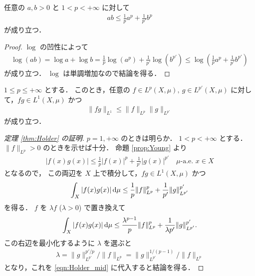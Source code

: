 \begin{proposition}\label{prop:Young}
    任意の $a,b>0$ と $1<p<+\infty$ に対して
    \begin{align*}
        ab\le\frac{1}{p}a^p+\frac{1}{p'}b^p
    \end{align*}
    が成り立つ．
\end{proposition}

\begin{proof}
    $\log$ の凹性によって
    \begin{align*}
        \log(ab)
        =\log a+\log b
        =\frac{1}{p}\log(a^p)+\frac{1}{p'}\log(b^{p'})
        \le\log\!\left(\frac{1}{p}a^p+\frac{1}{p'}b^{p'}\right)
    \end{align*}
    が成り立つ．
    $\log$ は単調増加なので結論を得る．
\end{proof}

\begin{theorem}\label{thm:Holder}
    $1\le p\le+\infty$ とする．
    このとき，任意の $f\in L^p(X,\mu),\ g\in L^{p'}(X,\mu)$ に対して，$fg\in L^1(X,\mu)$ かつ
    \begin{align*}
        \|fg\|_{L^1}\le\|f\|_{L^p}\|g\|_{L^{p'}}
    \end{align*}
    が成り立つ．
\end{theorem}

\begin{proof}[定理 \ref{thm:Holder} の証明]
    $p=1,+\infty$ のときは明らか．
    $1<p<+\infty$ とする．
    $\|f\|_{L^p}>0$ のときを示せば十分．
    命題 \ref{prop:Young} より
    \begin{align*}
        |f(x)g(x)|\le\frac{1}{p}|f(x)|^p+\frac{1}{p'}|g(x)|^{p'}\quad\textrm{$\mu$-a.e.\ $x\in X$}
    \end{align*}
    となるので，
    この両辺を $X$ 上で積分して，$fg\in L^1(X,\mu)$ かつ
    \begin{align*}
        \int_X|f(x)g(x)|\,\mathrm{d}\mu
        \le\frac{1}{p}\|f\|_{L^p}^p+\frac{1}{p'}\|g\|_{L^{p'}}^{p'}
    \end{align*}
    を得る．
    $f$ を $\lambda f$ ($\lambda>0$) で置き換えて
    \begin{align}
        \int_X|f(x)g(x)|\,\mathrm{d}\mu
        \le\frac{\lambda^{p-1}}{p}\|f\|_{L^p}^p+\frac{1}{\lambda p'}\|g\|_{L^{p'}}^{p'}.
        \label{eqn:Holder_mid}
    \end{align}
    この右辺を最小化するように $\lambda$ を選ぶと
    \begin{align*}
        \lambda
        =\|g\|_{L^{p'}}^{p'/p}/\|f\|_{L^p}
        =\|g\|_{L^{p'}}^{1/(p-1)}/\|f\|_{L^p}
    \end{align*}
    となり，これを \eqref{eqn:Holder_mid} に代入すると結論を得る．
\end{proof}

